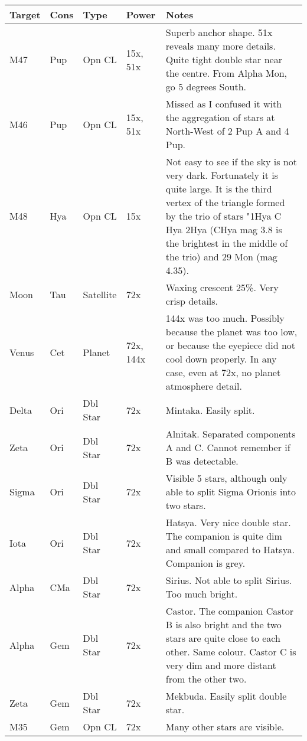 \begin{longtable}{ p{0.7in}  p{0.3in}  p{0.6in}  p{0.9in}  p{5.8in} }
\hline 
{\bf Target} & {\bf Cons} & {\bf Type} & {\bf Power} & {\bf Notes} \\ 
\hline 
M47 & Pup & Opn CL & 15x, 51x & Superb anchor shape. 51x reveals many more details. Quite tight double star near the centre. From Alpha Mon, go 5 degrees South. \\ 
M46 & Pup & Opn CL & 15x, 51x & Missed as I confused it with the aggregation of stars at North-West of 2 Pup A and 4 Pup.  \\ 
M48 & Hya & Opn CL & 15x & Not easy to see if the sky is not very dark. Fortunately it is quite large. It is the third vertex of the triangle formed by the trio of stars "1Hya C Hya 2Hya (CHya mag 3.8 is the brightest in the middle of the trio) and 29 Mon (mag 4.35).  \\ 
Moon & Tau & Satellite & 72x & Waxing crescent 25\%. Very crisp details.  \\ 
Venus & Cet & Planet & 72x, 144x & 144x was too much. Possibly because the planet was too low, or because the eyepiece did not cool down properly. In any case, even at 72x, no planet atmosphere detail.  \\ 
Delta & Ori & Dbl Star & 72x & Mintaka. Easily split.  \\ 
Zeta & Ori & Dbl Star & 72x & Alnitak. Separated components A and C. Cannot remember if B was detectable. \\ 
Sigma & Ori & Dbl Star & 72x & Visible 5 stars, although only able to split Sigma Orionis into two stars. \\ 
Iota & Ori & Dbl Star & 72x & Hatsya. Very nice double star. The companion is quite dim and small compared to Hatsya. Companion is grey.  \\ 
Alpha & CMa & Dbl Star & 72x & Sirius. Not able to split Sirius. Too much bright. \\ 
Alpha & Gem & Dbl Star & 72x & Castor. The companion Castor B is also bright and the two stars are quite close to each other. Same colour. Castor C is very dim and more distant from the other two. \\ 
Zeta & Gem & Dbl Star & 72x & Mekbuda. Easily split double star. \\ 
M35 & Gem & Opn CL & 72x & Many other stars are visible.  \\ 
\hline 
\end{longtable} 
